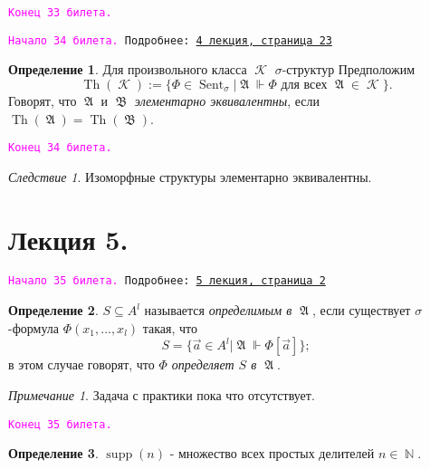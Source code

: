 \documentclass[a4paper,100pt]{article}
\theoremstyle{indented}
\theoremstyle{definition}
\newtheorem{defn}{Определение}
\theoremstyle{remark}
\newtheorem{remark}{Примечание}
\newtheorem{cons}{Следствие}
\DeclareMathOperator{\NN}{\mathbb{N}}
\DeclareMathOperator{\KK}{\mathscr{K}}
\DeclareMathOperator{\Sent}{Sent}
\DeclareMathOperator{\Th}{Th}
\DeclareMathOperator{\supp}{supp}
\DeclareMathOperator{\GA}{\mathfrak{A}}
\DeclareMathOperator{\GB}{\mathfrak{B}}
\begin{document}
\texttt{\textcolor{magenta}{Конец 33 билета.}} 

\hrulefill

\texttt{\hypertarget{b34}{\textcolor{magenta}{Начало 34 билета.}} Подробнее: \href{http://www.mi-ras.ru/~speranski/courses/logic-1-2021-spring/slides_4.pdf}{4 лекция, страница 23}} \\

\begin{defn}
  Для произвольного класса $\KK$ $\sigma$-структур Предположим
  \[
    \Th(\KK):=\{\Phi\in \Sent_\sigma |\GA \Vdash \Phi \text{ для всех }\GA \in \KK\}.
  \]
  Говорят, что $\GA$ и $\GB$ \textit{элементарно эквивалентны}, если $\Th(\GA)=\Th(\GB)$. 
\end{defn}

\texttt{\textcolor{magenta}{Конец 34 билета.}} 

\hrulefill

\begin{cons}
  Изоморфные структуры элементарно эквивалентны.
\end{cons}

\section{Лекция 5.}

\hrulefill

\texttt{\hypertarget{b35}{\textcolor{magenta}{Начало 35 билета.}} Подробнее: \href{http://www.mi-ras.ru/~speranski/courses/logic-1-2021-spring/slides_5.pdf}{5 лекция, страница 2}} \\

\begin{defn}
  $S\subseteq A^l$ называется \textit{определимым в $\GA$}, если существует $\sigma$-формула $\Phi(x_1, \ldots, x_l)$ такая, что 
  \[
    S=\{\vec{a}\in A^l|\GA\Vdash \Phi[\vec{a}]\}; 
  \]
  в этом случае говорят, что \textit{$\Phi$ определяет $S$ в $\GA$}. 
\end{defn}

\begin{remark}
  Задача с практики пока что отсутствует.
\end{remark}

\texttt{\textcolor{magenta}{Конец 35 билета.}} 

\hrulefill

\begin{defn}
  $\supp(n)$ - множество всех простых делителей $n\in \NN$. 
\end{defn}
\end{document}
